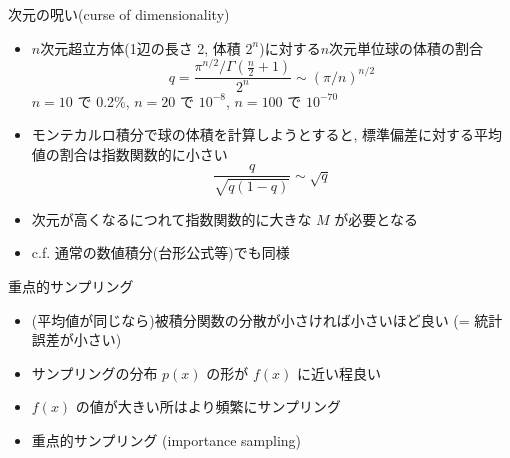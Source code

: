 \begin{frame}[t,fragile]{次元の呪い(curse of dimensionality)}
  \begin{itemize}
  \item $n$次元超立方体(1辺の長さ 2, 体積 $2^n$)に対する$n$次元単位球の体積の割合
    \[
    q = \frac{\pi^{n/2} / \Gamma(\frac{n}{2}+1)}{2^n} \sim (\pi/n)^{n/2}
    \]
    $n=10$ で 0.2\%, $n=20$ で $10^{-8}$, $n=100$ で $10^{-70}$
  \item モンテカルロ積分で球の体積を計算しようとすると, 標準偏差に対する平均値の割合は指数関数的に小さい
    \[
    \frac{q}{\sqrt{q(1-q)}} \sim \sqrt{q}
    \]
  \item 次元が高くなるにつれて指数関数的に大きな $M$ が必要となる
  \item c.f. 通常の数値積分(台形公式等)でも同様
  \end{itemize}
\end{frame}

\begin{frame}[t,fragile]{重点的サンプリング}
  \begin{itemize}
    \setlength{\itemsep}{1em}
  \item (平均値が同じなら)被積分関数の分散が小さければ小さいほど良い (= 統計誤差が小さい)
  \item サンプリングの分布 $p(x)$ の形が $f(x)$ に近い程良い
  \item $f(x)$ の値が大きい所はより頻繁にサンプリング
  \item 重点的サンプリング (importance sampling)
  \end{itemize}
\end{frame}

